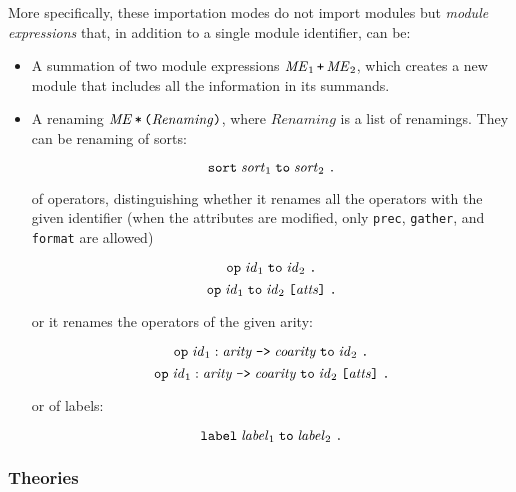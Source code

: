 More specifically, these importation modes do not import modules but
\emph{module expressions} that, in addition to a single module identifier,
can be:

\begin{itemize}
\item
A summation of two module expressions $\mathit{ME}_1 \,\verb"+"\,\mathit{ME}_2$,
which creates a new module that includes all the information in its summands.

\item
A renaming $\mathit{ME} \,\verb"*"\, \verb"("\mathit{Renaming}\verb")"$, where 
$\mathit{Renaming}$ is a list of renamings. They can be renaming of sorts:

$$
\verb"sort"\; \mathit{sort}_1\; \verb"to"\; \mathit{sort}_2\; \verb"."
$$

of operators, distinguishing whether it renames all the operators
with the given identifier (when the attributes are modified, only
\verb"prec", \verb"gather", and \verb"format" are allowed)

$$
\verb"op"\; \mathit{id}_1\; \verb"to"\; \mathit{id}_2\; \verb"."
$$
\vspace{-3ex}
$$
\verb"op"\; \mathit{id}_1\; \verb"to"\; \mathit{id}_2\; \verb"[" \mathit{atts} \verb"]"
\;  \verb"."
$$

\noindent or it renames the operators of the given arity:

$$
\verb"op"\; \mathit{id}_1 : \mathit{arity}\; \verb"->" \; \mathit{coarity}\;
\verb"to"\; \mathit{id}_2\; \verb"."
$$
\vspace{-3ex}
$$
\verb"op"\; \mathit{id}_1 : \mathit{arity}\; \verb"->" \; \mathit{coarity}\;
\verb"to"\; \mathit{id}_2\; \verb"[" \mathit{atts} \verb"]" \; \verb"."
$$

or of labels:

$$
\verb"label"\; \mathit{label}_1\; \verb"to"\; \mathit{label}_2\; \verb"."
$$

\end{itemize}

\subsubsection{Theories}\label{subsec:theories}

